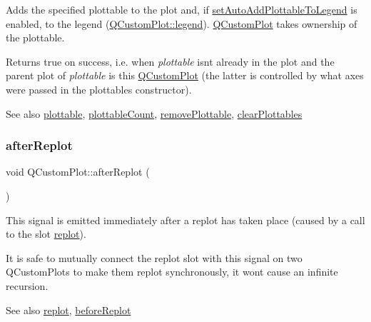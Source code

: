 Adds the specified plottable to the plot and, if \hyperlink{class_q_custom_plot_ad8858410c2db47b7104040a3aa61c3fc}{set\+Auto\+Add\+Plottable\+To\+Legend} is enabled, to the legend (\hyperlink{class_q_custom_plot_a4eadcd237dc6a09938b68b16877fa6af}{Q\+Custom\+Plot\+::legend}). \hyperlink{class_q_custom_plot}{Q\+Custom\+Plot} takes ownership of the plottable.

Returns true on success, i.\+e. when {\itshape plottable} isn\textquotesingle{}t already in the plot and the parent plot of {\itshape plottable} is this \hyperlink{class_q_custom_plot}{Q\+Custom\+Plot} (the latter is controlled by what axes were passed in the plottable\textquotesingle{}s constructor).

\begin{DoxySeeAlso}{See also}
\hyperlink{class_q_custom_plot_a32de81ff53e263e785b83b52ecd99d6f}{plottable}, \hyperlink{class_q_custom_plot_a5f4f15991c14bf9ad659bb2a19dfbed4}{plottable\+Count}, \hyperlink{class_q_custom_plot_af3dafd56884208474f311d6226513ab2}{remove\+Plottable}, \hyperlink{class_q_custom_plot_a9a409bb3201878adb7ffba1c89c4e004}{clear\+Plottables} 
\end{DoxySeeAlso}
\hypertarget{class_q_custom_plot_a6f4fa624af060bc5919c5f266cf426a0}{}\label{class_q_custom_plot_a6f4fa624af060bc5919c5f266cf426a0} 
\subsubsection{\texorpdfstring{after\+Replot}{afterReplot}}
{\footnotesize\ttfamily void Q\+Custom\+Plot\+::after\+Replot (\begin{DoxyParamCaption}{ }\end{DoxyParamCaption})\hspace{0.3cm}{\ttfamily [signal]}}

This signal is emitted immediately after a replot has taken place (caused by a call to the slot \hyperlink{class_q_custom_plot_a606fd384b2a637ce2c24899bcbde77d6}{replot}).

It is safe to mutually connect the replot slot with this signal on two Q\+Custom\+Plots to make them replot synchronously, it won\textquotesingle{}t cause an infinite recursion.

\begin{DoxySeeAlso}{See also}
\hyperlink{class_q_custom_plot_a606fd384b2a637ce2c24899bcbde77d6}{replot}, \hyperlink{class_q_custom_plot_a0cd30e29b73efd6afe096e44bc5956f5}{before\+Replot} 
\end{DoxySeeAlso}
\hypertarget{class_q_custom_plot_abf635f8b56ab5c16d5de9f358543e82b}{}\label{class_q_custom_plot_abf635f8b56ab5c16d5de9f358543e82b} 
